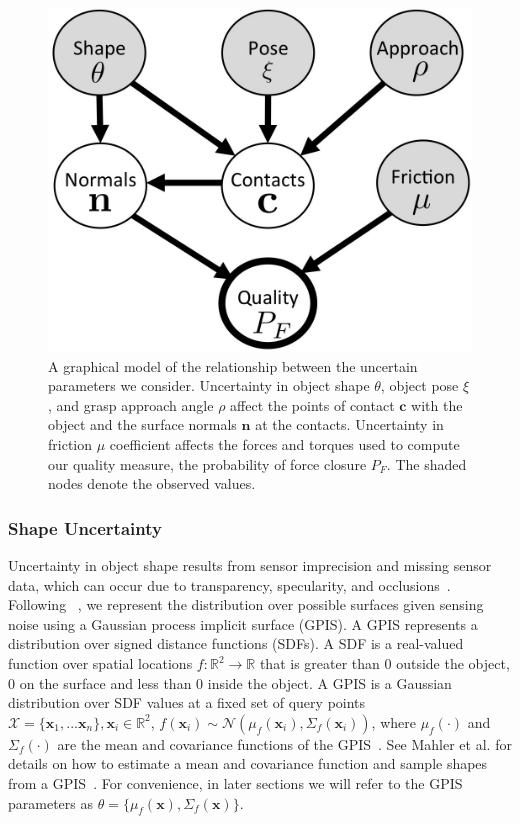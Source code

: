 \documentclass[10pt, conference]{ieeeconf}      %
\newcommand{\bc}{\mathbf{c}}
\newcommand{\bn}{\mathbf{n}}
\newcommand{\bx}{\mathbf{x}}
\newcommand{\mX}{\mathcal{X}}
\newcommand{\mN}{\mathcal{N}}
\begin{document}
\begin{figure}[t!]
\centering
\includegraphics[scale=0.18]{figures/Graphical_Model.jpg}
\caption{A graphical model of the relationship between the uncertain parameters we consider. Uncertainty in object shape $\theta$, object pose $\xi$, and grasp approach angle $\rho$ affect the points of contact $\bc$ with the object and the surface normals $\bn$ at the contacts. Uncertainty in friction $\mu$ coefficient affects the forces and torques used to compute our quality measure, the probability of force closure $P_F$. The shaded nodes denote the observed values.  }
\vspace*{-10pt}
\label{fig:graphical_model}
\end{figure}

\subsubsection{Shape Uncertainty}

Uncertainty in object shape results from sensor imprecision and missing sensor data, which can occur due to transparency, specularity, and occlusions~\cite{mahler2015gp}.
Following ~\cite{mahler2015gp}, we represent the distribution over possible surfaces given sensing noise using a Gaussian process implicit surface (GPIS).
A GPIS represents a distribution over signed distance functions (SDFs).
A SDF is a real-valued function over spatial locations $f: \mathbb{R}^2 \rightarrow \mathbb{R}$ that is greater than 0 outside the object, 0 on the surface and less than 0 inside the object.
A GPIS is a Gaussian distribution over SDF values at a fixed set of query points $\mX = \{\bx_1, ... \bx_n\}, \bx_i \in \mathbb{R}^2$, $f(\bx_i) \sim \mN(\mu_{f}(\bx_i),\Sigma_{f}(\bx_i))$, where $\mu_{f}(\cdot)$ and $\Sigma_{f}(\cdot)$ are the mean and covariance functions of the GPIS~\cite{rasmussen2006}.
See Mahler et al. for details on how to estimate a mean and covariance function and sample shapes from a GPIS~\cite{mahler2015gp}.
For convenience, in later sections we will refer to the GPIS parameters as $\theta = \lbrace \mu_{f}(\bx), \Sigma_{f}(\bx) \rbrace$. 
\end{document}

